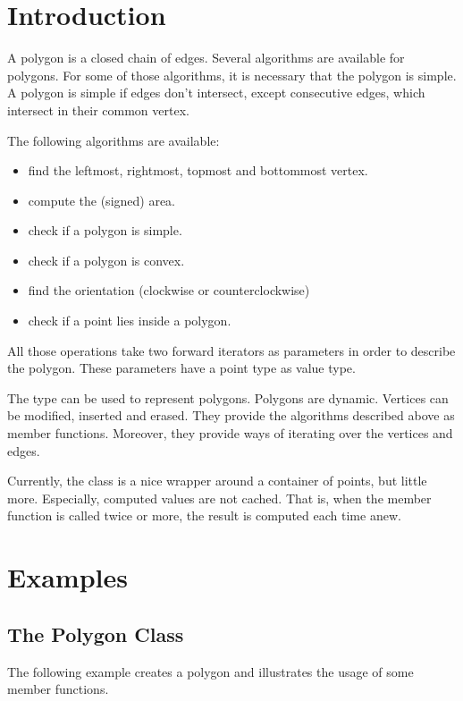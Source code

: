 


\section{Introduction}

A polygon is a closed chain of edges. Several algorithms are available for
polygons. For some of those algorithms, it is necessary that the polygon is
simple. A polygon is simple if edges don't intersect, except consecutive edges,
which intersect in their common vertex.

The following algorithms are available:
\begin{itemize}
\item find the leftmost, rightmost, topmost and bottommost vertex.
\item compute the (signed) area.
\item check if a polygon is simple.
\item check if a polygon is convex.
\item find the orientation (clockwise or counterclockwise)
\item check if a point lies inside a polygon.
\end{itemize}
All those operations take two forward iterators as parameters in order to
describe the polygon. These parameters have a point type as value type.

The type  can be used to represent polygons.
Polygons are dynamic. Vertices can be modified, inserted and erased.
They provide the algorithms described above as member functions.
Moreover, they provide ways of iterating over the vertices and edges.

Currently, the  class is a nice wrapper around a container of
points, but little more. Especially, computed values are not cached.
That is, when the  member function is called twice or more,
the result is computed each time anew. 

\section{Examples}

\subsection{The Polygon Class}

The following example creates a polygon and illustrates the usage of some member functions.

